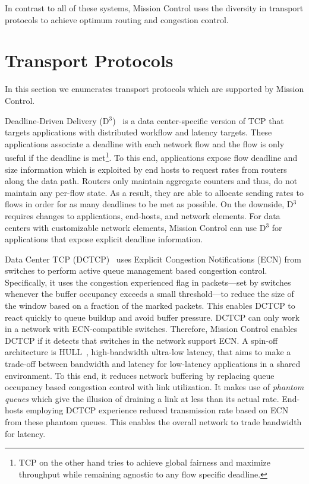 \documentclass[a4paper,12pt,twoside,openright]{report}
\begin{document}
In contrast to all of these systems, Mission Control uses the diversity in
transport protocols to achieve optimum routing and congestion control.

\section{Transport Protocols}
In this section we enumerates transport protocols which are supported by Mission
Control.

Deadline-Driven Delivery (D$^3$)~\cite{Wilson:2011:BNL} is a data
center-specific version of TCP that targets applications with distributed
workflow and latency targets. These applications associate a deadline with each
network flow and the flow is only useful if the deadline is met\footnote{TCP on
the other hand tries to achieve global fairness and maximize throughput while
remaining agnostic to any flow specific deadline.}. To this end, applications
expose flow deadline and size information which is exploited by end hosts to
request rates from routers along the data path. Routers only maintain aggregate
counters and thus, do not maintain any per-flow state. As a result, they are
able to allocate sending rates to flows in order for as many deadlines to be met
as possible. On the downside, D$^3$ requires changes to applications, end-hosts,
and network elements. For data centers with customizable network elements,
Mission Control can use D$^3$ for applications that expose explicit deadline
information.

Data Center TCP (DCTCP)~\cite{Alizadeh:2010:DCT} uses Explicit Congestion
Notifications (ECN) from switches to perform active queue management based
congestion control. Specifically, it uses the congestion experienced flag in
packets---set by switches whenever the buffer occupancy exceeds a small
threshold---to reduce the size of the window based on a fraction of the marked
packets. This enables DCTCP to react quickly to queue buildup and avoid buffer
pressure. DCTCP can only work in a network with ECN-compatible switches.
Therefore, Mission Control enables DCTCP if it detects that switches in the
network support ECN. A spin-off architecture is HULL~\cite{Alizadeh:2012:LIM},
high-bandwidth ultra-low latency, that aims to make a trade-off between
bandwidth and latency for low-latency applications in a shared environment. To
this end, it reduces network buffering by replacing queue occupancy based
congestion control with link utilization. It makes use of \emph{phantom queues}
which give the illusion of draining a link at less than its actual rate.
End-hosts employing DCTCP experience reduced transmission rate based on ECN from
these phantom queues. This enables the overall network to trade bandwidth for
latency.
\end{document}
